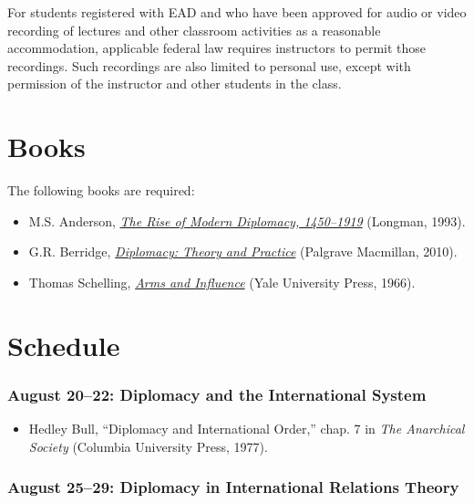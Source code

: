 For students registered with EAD and who have been approved for audio or
video recording of lectures and other classroom activities as a
reasonable accommodation, applicable federal law requires instructors to
permit those recordings. Such recordings are also limited to personal
use, except with permission of the instructor and other students in the
class.

\section{Books}\label{books}

The following books are required:

\begin{itemize}
\item
  M.S. Anderson, \href{http://amzn.com/0582212375}{\emph{The Rise of
  Modern Diplomacy, 1450--1919}} (Longman, 1993).
\item
  G.R. Berridge, \href{http://amzn.com/0230229603}{\emph{Diplomacy:
  Theory and Practice}} (Palgrave Macmillan, 2010).
\item
  Thomas Schelling, \href{http://amzn.com/0300002211}{\emph{Arms and
  Influence}} (Yale University Press, 1966).
\end{itemize}

\section{Schedule}\label{schedule}

\subsubsection{August 20--22: Diplomacy and the International
System}\label{august-2022-diplomacy-and-the-international-system}

\begin{itemize}
\itemsep1pt\parskip0pt
\item
  Hedley Bull, ``Diplomacy and International Order,'' chap. 7 in
  \emph{The Anarchical Society} (Columbia University Press, 1977).
\end{itemize}

\subsubsection{August 25--29: Diplomacy in International Relations
Theory}\label{august-2529-diplomacy-in-international-relations-theory}

